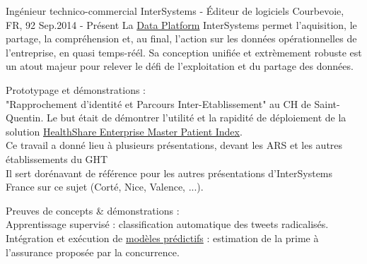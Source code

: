 

\begin{cventries}

  \cventry
    {Ingénieur technico-commercial} %
    {InterSystems - \'Editeur de logiciels} %
    {Courbevoie, FR, 92} %
    {Sep.2014 - Présent} %
{
La \href{https://www.intersystems.com/products/intersystems-iris/}{Data Platform} InterSystems permet l'aquisition, le partage, la compréhension et, au final, l'action sur les données opérationnelles de l'entreprise, en quasi temps-réél. Sa conception unifiée et extrèmement robuste est un atout majeur pour relever le défi de l'exploitation et du partage des données.
} %
{
      \begin{cvitems} %
        \item {Prototypage et démonstrations :\\"Rapprochement d'identité et Parcours Inter-Etablissement" au CH de Saint-Quentin. Le but était de démontrer l'utilité et la rapidité de déploiement de la solution \href{https://www.intersystems.com/products/healthshare/patient-index/}{HealthShare Enterprise Master Patient Index}.\\Ce travail a donné lieu à plusieurs présentations, devant les ARS et les autres établissements du GHT\\Il sert dorénavant de référence pour les autres présentations d'InterSystems France sur ce sujet (Corté, Nice, Valence, ...).}
        \item {Preuves de concepts \& démonstrations :\\Apprentissage supervisé : classification automatique des tweets radicalisés.\\Intégration et exécution de \href{https://learning.intersystems.com/pluginfile.php/15024/mod_resource/content/4/AnInterSystemsGuideToTheDataGalaxy.pdf}{modèles prédictifs} : estimation de la prime à l'assurance proposée par la concurrence.}

\end{cvitems}}
\end{cventries}

